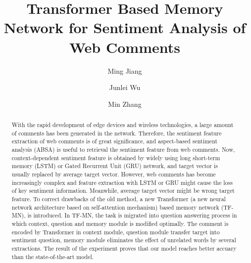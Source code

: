 \documentclass[runningheads, twocolumn]{llncs}
\begin{document}
%
\title{Transformer Based Memory Network for Sentiment Analysis of Web Comments}
%
%
\author{Ming Jiang\and
Junlei Wu\and
Min Zhang}
%
%
%
\maketitle              %
%
\begin{abstract}
With the rapid development of edge devices and wireless technologies, a large amount of comments has been generated in the network. Therefore, the sentiment feature extraction of web comments is of great significance, and aspect-based sentiment analysis (ABSA) is useful to retrieval the sentiment feature from web comments. Now, context-dependent sentiment feature is obtained by widely using long short-term memory (LSTM) or Gated Recurrent Unit (GRU) network, and target vector is usually replaced by average target vector. However, web comments has become increasingly complex and feature extraction with LSTM or GRU might cause the loss of key sentiment information. Meanwhile, average target vector might be wrong target feature. To correct drawbacks of the old method, a new Transformer (a new neural network architecture based on self-attention mechanism) based memory network (TF-MN), is introduced. In TF-MN, the task is migrated into question answering process in which context, question and memory module is modified optimally. The comment is encoded by Transformer in context module, question module transfer target into sentiment question, memory module eliminates the effect of unrelated words by several extractions. The result of the experiment proves that our model reaches better accuary than the state-of-the-art model.

\end{abstract}
%
%
%
\end{document}
